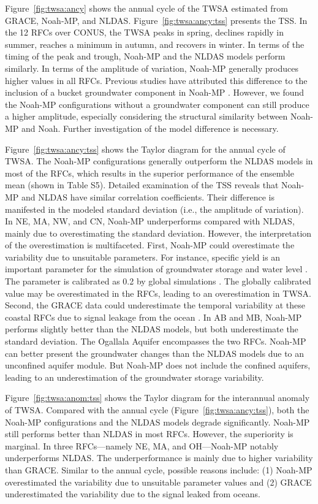 \documentclass[essd, manuscript]{copernicus}
\begin{document}
Figure~\ref{fig:twsa:ancy} shows the annual cycle of the TWSA estimated from GRACE, Noah-MP, and NLDAS\@. Figure~\ref{fig:twsa:ancy:tss} presents the TSS\@. In the 12 RFCs over CONUS, the TWSA peaks in spring, declines rapidly in summer, reaches a minimum in autumn, and recovers in winter. In terms of the timing of the peak and trough, Noah-MP and the NLDAS models perform similarly. In terms of the amplitude of variation, Noah-MP generally produces higher values in all RFCs. Previous studies have attributed this difference to the inclusion of a bucket groundwater component in Noah-MP \citep{cai2014JGRAa, ma2017JGRA}. However, we found the Noah-MP configurations without a groundwater component can still produce a higher amplitude, especially considering the structural similarity between Noah-MP and Noah. Further investigation of the model difference is necessary.

Figure~\ref{fig:twsa:ancy:tss} shows the Taylor diagram for the annual cycle of TWSA\@. The Noah-MP configurations generally outperform the NLDAS models in most of the RFCs, which results in the superior performance of the ensemble mean (shown in Table S5). Detailed examination of the TSS reveals that Noah-MP and NLDAS have similar correlation coefficients. Their difference is manifested in the modeled standard deviation (i.e., the amplitude of variation). In NE, MA, NW, and CN, Noah-MP underperforms compared with NLDAS, mainly due to overestimating the standard deviation. However, the interpretation of the overestimation is multifaceted. First, Noah-MP could overestimate the variability due to unsuitable parameters. For instance, specific yield is an important parameter for the simulation of groundwater storage and water level \citep{lv2021JAMES}. The parameter is calibrated as 0.2 by global simulations \citep{niu2007JGRa}. The globally calibrated value may be overestimated in the RFCs, leading to an overestimation in TWSA\@. Second, the GRACE data could underestimate the temporal variability at these coastal RFCs due to signal leakage from the ocean \citep{cai2014JGRAa}. In AB and MB, Noah-MP performs slightly better than the NLDAS models, but both underestimate the standard deviation. The Ogallala Aquifer encompasses the two RFCs. Noah-MP can better present the groundwater changes than the NLDAS models due to an unconfined aquifer module. But Noah-MP does not include the confined aquifers, leading to an underestimation of the groundwater storage variability.

Figure~\ref{fig:twsa:anom:tss} shows the Taylor diagram for the interannual anomaly of TWSA\@. Compared with the annual cycle (Figure~\ref{fig:twsa:ancy:tss}), both the Noah-MP configurations and the NLDAS models degrade significantly. Noah-MP still performs better than NLDAS in most RFCs. However, the superiority is marginal. In three RFCs---namely NE, MA, and OH---Noah-MP notably underperforms NLDAS\@. The underperformance is mainly due to higher variability than GRACE\@. Similar to the annual cycle, possible reasons include: (1) Noah-MP overestimated the variability due to unsuitable parameter values and (2) GRACE underestimated the variability due to the signal leaked from oceans.
\end{document}
